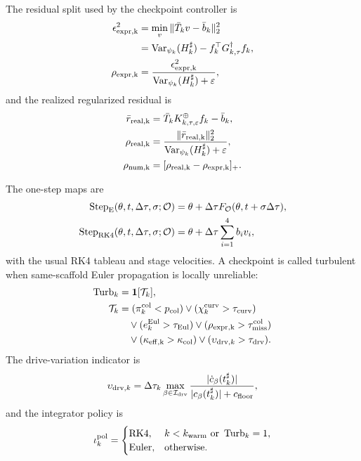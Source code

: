 \documentclass[
  reprint,
  amsmath,
  amssymb,
  aps,
  pra,
  nofootinbib,
  superscriptaddress,
  floatfix
]{revtex4-2}
\newcommand{\Oset}{\mathcal{O}}
\newcommand{\drv}{\mathrm{drv}}
\newcommand{\Var}{\operatorname{Var}}
\newcommand{\eps}{\varepsilon}
\begin{document}
The residual split used by the checkpoint controller is
\begin{equation}
\begin{aligned}
\epsilon_{\rm expr,k}^2
&=\min_v\|\bar T_kv-\bar b_k\|_2^2\\
&=\Var_{\psi_k}(H_k^\sharp)-f_k^\top G_{k,\tau}^\dagger f_k,\\
\rho_{\rm expr,k}
&=\frac{\epsilon_{\rm expr,k}^2}{\Var_{\psi_k}(H_k^\sharp)+\eps},
\end{aligned}
\label{eq:expr_miss}
\end{equation}
and the realized regularized residual is
\begin{equation}
\begin{aligned}
\bar r_{\rm real,k}&=\bar T_kK_{k,\tau,\eps}^{\oplus}f_k-\bar b_k,\\
\rho_{\rm real,k}&=\frac{\|\bar r_{\rm real,k}\|_2^2}{\Var_{\psi_k}(H_k^\sharp)+\eps},\\
\rho_{\rm num,k}&=[\rho_{\rm real,k}-\rho_{\rm expr,k}]_+ .
\end{aligned}
\label{eq:num_miss}
\end{equation}

The one-step maps are
\begin{equation}
\begin{aligned}
\operatorname{Step}_{\rm E}(\theta,t,\Delta\tau,\sigma;\Oset)
&=\theta+\Delta\tau F_{\Oset}(\theta,t+\sigma\Delta\tau),\\
\operatorname{Step}_{\rm RK4}(\theta,t,\Delta\tau,\sigma;\Oset)
&=\theta+\Delta\tau\sum_{i=1}^4 b_i v_i ,
\end{aligned}
\label{eq:step_maps}
\end{equation}
with the usual RK4 tableau and stage velocities. A checkpoint is called turbulent when same-scaffold Euler propagation is locally unreliable:
\begin{equation}
\begin{aligned}
\operatorname{Turb}_k&=\mathbf 1[\mathcal T_k],\\
\mathcal T_k&=
(\pi_k^{\rm col}<p_{\rm col})
\vee(\chi_k^{\rm curv}>\tau_{\rm curv})\\
&\quad\vee(e_k^{\rm Eul}>\tau_{\rm Eul})
\vee(\rho_{\rm expr,k}>\tau_{\rm miss}^{\rm col})\\
&\quad\vee(\kappa_{\rm eff,k}>\kappa_{\rm col})
\vee(\upsilon_{\drv,k}>\tau_{\drv}) .
\end{aligned}
\label{eq:turbulent_period}
\end{equation}
The drive-variation indicator is
\begin{equation}
\upsilon_{\drv,k}=\Delta\tau_k
\max_{\beta\in\mathcal I_{\drv}}
\frac{|\dot c_\beta(t_k^\sharp)|}{|c_\beta(t_k^\sharp)|+c_{\rm floor}},
\label{eq:drive_variation}
\end{equation}
and the integrator policy is
\begin{equation}
\iota_k^{\rm pol}=
\begin{cases}
{\rm RK4},& k<k_{\rm warm}\ \text{or}\ \operatorname{Turb}_k=1,\\
{\rm Euler},&\text{otherwise.}
\end{cases}
\label{eq:integrator_policy}
\end{equation}
\end{document}
